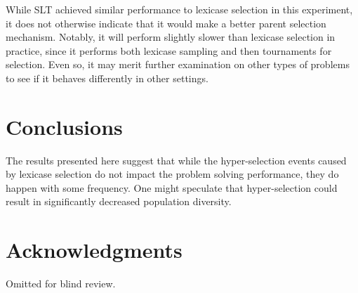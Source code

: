 \documentclass{sig-alternate}
\begin{document}
While SLT achieved similar performance to lexicase selection in this experiment, it does not otherwise indicate that it would make a better parent selection mechanism. Notably, it will perform slightly slower than lexicase selection in practice, since it performs both lexicase sampling and then tournaments for selection. Even so, it may merit further examination on other types of problems to see if it behaves differently in other settings.


\section{Conclusions}

The results presented here suggest that while the hyper-selection events caused by lexicase selection do not impact the problem solving performance, they do happen with some frequency. One might speculate that hyper-selection could result in significantly decreased population diversity.



\section{Acknowledgments}
Omitted for blind review.

%

%
%
\end{document}
